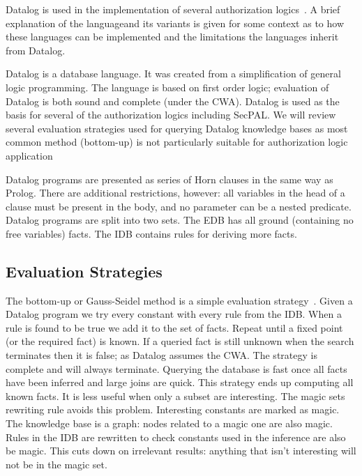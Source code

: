 \documentclass[thesis.tex]{subfiles}
\begin{document}

Datalog is used in the implementation of several authorization
logics~\cite{detreville_binder_2002,li_distributed_2003,becker_secpal:_2010}. A brief explanation of the languageand its variants is given for some context as to how these languages
can be implemented and the limitations the languages inherit from
Datalog.

Datalog is a database language. It was created from a simplification
of general logic programming. The language is based on first order
logic; evaluation of Datalog is both sound and complete (under the
\ac{CWA}). Datalog is used as the basis for several of the
authorization logics including SecPAL. We will review several
evaluation strategies used for querying Datalog knowledge bases as
most common method (bottom-up) is not particularly suitable for
authorization logic application

Datalog programs are presented as series of Horn clauses in the same
way as Prolog. There are additional restrictions, however: all
variables in the head of a clause must be present in the body, and no
parameter can be a nested predicate.  Datalog programs are split into
two sets. The \ac{EDB} has all ground (containing no free variables)
facts. The \ac{IDB} contains rules for deriving more facts.

\subsection{Evaluation Strategies}

The bottom-up or Gauss-Seidel method is a simple evaluation strategy~\cite{???}. Given a
Datalog program we try every constant with every rule from the IDB. When a rule is
found to be true we add it to the set of facts. Repeat until a fixed point (or the required fact) is known. If a queried fact is still unknown when the search terminates then it is
false; as Datalog assumes the CWA. The strategy is complete and will always terminate.
Querying the database is fast once all facts have been inferred and large joins are quick.
This strategy ends up computing all known facts. It is less useful when only a subset are
interesting. The magic sets~\cite{???} rewriting rule avoids this problem. Interesting constants
are marked as magic. The knowledge base is a graph: nodes related to a magic one are
also magic. Rules in the IDB are rewritten to check constants used in the inference are
also be magic. This cuts down on irrelevant results: anything that isn't interesting will
not be in the magic set.
\end{document}

